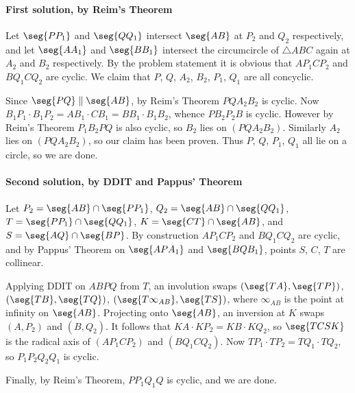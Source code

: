 \paragraph{First solution, by Reim's Theorem}     Let $\seg{PP_1}$ and $\seg{QQ_1}$ intersect $\seg{AB}$ at $P_2$ and $Q_2$ respectively, and let $\seg{AA_1}$ and $\seg{BB_1}$ intersect the circumcircle of $\triangle ABC$ again at $A_2$ and $B_2$ respectively. By the problem statement it is obvious that $AP_1CP_2$ and $BQ_1CQ_2$ are cyclic. We claim that $P$, $Q$, $A_2$, $B_2$, $P_1$, $Q_1$ are all concyclic.

Since $\seg{PQ}\parallel\seg{AB}$, by Reim's Theorem $PQA_2B_2$ is cyclic. Now $B_1P_1\cdot B_1P_2=AB_1\cdot CB_1=BB_1\cdot B_1B_2$, whence $PB_2P_2B$ is cyclic. However by Reim's Theorem $P_1B_2PQ$ is also cyclic, so $B_2$ lies on $(PQA_2B_2)$. Similarly $A_2$ lies on $(PQA_2B_2)$, so our claim has been proven. Thus $P$, $Q$, $P_1$, $Q_1$ all lie on a circle, so we are done.

\paragraph{Second solution, by DDIT and Pappus' Theorem}     Let $P_2=\seg{AB}\cap\seg{PP_1}$, $Q_2=\seg{AB}\cap\seg{QQ_1}$, $T=\seg{PP_1}\cap\seg{QQ_1}$, $K=\seg{CT}\cap\seg{AB}$, and $S=\seg{AQ}\cap\seg{BP}$. By construction $AP_1CP_2$ and $BQ_1CQ_2$ are cyclic, and by Pappus' Theorem on $\seg{APA_1}$ and $\seg{BQB_1}$, points $S$, $C$, $T$ are collinear.

Applying DDIT on $ABPQ$ from $T$, an involution swaps $(\seg{TA},\seg{TP})$, $(\seg{TB},\seg{TQ})$, $(\seg{T\infty_{AB}},\seg{TS})$, where $\infty_{AB}$ is the point at infinity on $\seg{AB}$. Projecting onto $\seg{AB}$, an inversion at $K$ swaps $(A,P_2)$ and $(B,Q_2)$. It follows that $KA\cdot KP_2=KB\cdot KQ_2$, so $\seg{TCSK}$ is the radical axis of $(AP_1CP_2)$ and $(BQ_1CQ_2)$. Now $TP_1\cdot TP_2=TQ_1\cdot TQ_2$, so $P_1P_2Q_2Q_1$ is cyclic.

Finally, by Reim's Theorem, $PP_1Q_1Q$ is cyclic, and we are done.

